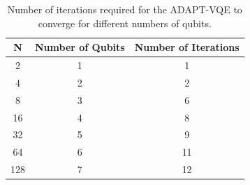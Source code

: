 \begin{table}[ht]
    \centering
    \caption{Number of iterations required for the ADAPT-VQE to converge for different numbers of qubits.}
    \label{tab:howmany}

    \begin{tabular}{c c c}
	\toprule
	\textbf{N} & \textbf{Number of Qubits} & \textbf{Number of Iterations} \\
	\midrule
	2 & 1 & 1 \\
	4 & 2 & 2 \\
	8 & 3 & 6 \\
	16 & 4 & 8 \\
	32 & 5 & 9 \\
	64 & 6 & 11 \\
	128 & 7 & 12 \\
	\bottomrule
    \end{tabular}
\end{table}
